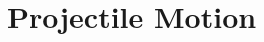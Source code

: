 \documentclass[12pt,compress,aspectratio=169,dvipsnames]{beamer}
\begin{document}
%
%
%
%
%
%
%



\section{Projectile Motion}
\end{document}
